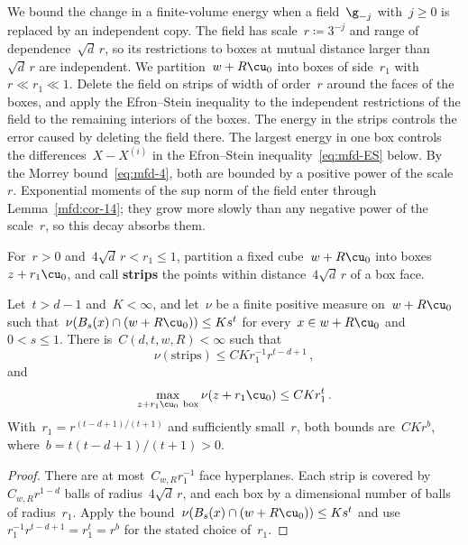 \documentclass[11pt]{amsart}
\begin{document}
We bound the change in a finite-volume energy when a field~$\g_{-j}$ with~$j\geq0$ is replaced by an independent copy. The field has scale~$r\coloneqq3^{-j}$ and range of dependence~$\sqrt d\,r$, so its restrictions to boxes at mutual distance larger than~$\sqrt d\,r$ are independent. We partition~$w+R\cu_0$ into boxes of side~$r_1$ with~$r\ll r_1\ll1$. Delete the field on strips of width of order~$r$ around the faces of the boxes, and apply the Efron--Stein inequality to the independent restrictions of the field to the remaining interiors of the boxes. The energy in the strips controls the error caused by deleting the field there. The largest energy in one box controls the differences~$X-X^{(i)}$ in the Efron--Stein inequality~\eqref{eq:mfd-ES} below. By the Morrey bound~\eqref{eq:mfd-4}, both are bounded by a positive power of the scale~$r$. Exponential moments of the sup norm of the field enter through Lemma~\ref{mfd:cor-14}; they grow more slowly than any negative power of the scale~$r$, so this decay absorbs them.

For~$r>0$ and~$4\sqrt d\,r<r_1\leq1$, partition a fixed cube~$w+R\cu_0$ into boxes~$z+r_1\cu_0$, and call \textbf{strips} the points within distance~$4\sqrt d\,r$ of a box face.

\begin{lemma}
\label{mfd:lem-strips}
Let~$t>d-1$ and~$K<\infty$, and let~$\nu$ be a finite positive measure on~$w+R\cu_0$ such that~$\nu(B_s(x)\cap(w+R\cu_0))\leq Ks^t$ for every~$x\in w+R\cu_0$ and~$0<s\leq1$. There is~$C(d,t,w,R)<\infty$ such that
\begin{equation*}
	\nu(\text{strips})\leq CKr_1^{-1}r^{t-d+1}\,,
\end{equation*}
and
\begin{equation*}
	\max_{z+r_1\cu_0\ \mathrm{box}}\nu(z+r_1\cu_0)\leq CKr_1^t\,.
\end{equation*}
With~$r_1=r^{(t-d+1)/(t+1)}$ and sufficiently small~$r$, both bounds are~$CKr^b$, where~$b=t(t-d+1)/(t+1)>0$.
\end{lemma}

\begin{proof}
There are at most~$C_{w,R}r_1^{-1}$ face hyperplanes. Each strip is covered by~$C_{w,R}r^{1-d}$ balls of radius~$4\sqrt d\,r$, and each box by a dimensional number of balls of radius~$r_1$. Apply the bound~$\nu(B_s(x)\cap(w+R\cu_0))\leq Ks^t$ and use~$r_1^{-1}r^{t-d+1}=r_1^t=r^b$ for the stated choice of~$r_1$.
\end{proof}
\end{document}
